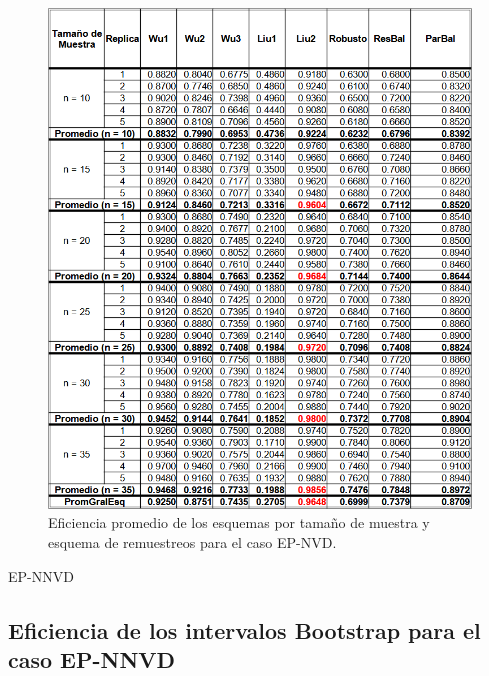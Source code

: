 \begin{figure}[ht] 
	\centering 
	\includegraphics[width=0.9\linewidth]{img/EP_NVD_Efic_Esq.png} 
	\caption{Eficiencia promedio de los esquemas por tamaño de muestra y esquema de remuestreos para el caso EP-NVD.} 
	\label{fig:EP_NVD_Esq}
\end{figure}

EP-NNVD
\subsection{Eficiencia de los intervalos Bootstrap para el caso EP-NNVD}

